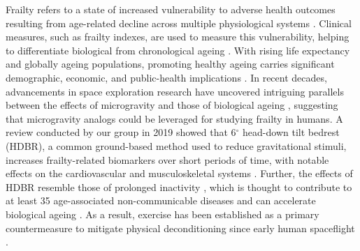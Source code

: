 \documentclass[preprint,12pt,authoryear]{elsarticle}
\begin{document}
   Frailty refers to a state of increased vulnerability to adverse health outcomes resulting from age-related decline across multiple physiological systems \citep{lengFrailtySyndromeOverview2014}. Clinical measures, such as frailty indexes, are used to measure this vulnerability, helping to differentiate biological from chronological ageing \citep{lengFrailtySyndromeOverview2014, rockwoodAgerelatedDeficitAccumulation2019}. With rising life expectancy and globally ageing populations, promoting healthy ageing carries significant demographic, economic, and public-health implications \citep{sowaPredictorsHealthyAgeing2016, roweSuccessfulAging1997}. In recent decades, advancements in space exploration research have uncovered intriguing parallels between the effects of microgravity and those of biological ageing \citep{vernikosSpaceGravityPhysiology2009, pavy-letraonSpaceEarthAdvances2007}, suggesting that microgravity analogs could be leveraged for studying frailty in humans. A review conducted by our group in 2019 showed that 6$^\circ$ head-down tilt bedrest (HDBR), a common ground-based method used to reduce gravitational stimuli, increases frailty-related biomarkers over short periods of time, with notable effects on the cardiovascular and musculoskeletal systems \citep{kehlerBedRestAccelerated2019}. Further, the effects of HDBR resemble those of prolonged inactivity \citep{vernikosSpaceGravityPhysiology2009, pavy-letraonSpaceEarthAdvances2007}, which is thought to contribute to at least 35 age-associated non-communicable diseases and can accelerate biological ageing \citep{boothRoleInactivityChronic2017}. As a result, exercise has been established as a primary countermeasure to mitigate physical deconditioning since early human spaceflight \citep{hedgeImplementationExerciseCountermeasures2022}.
\end{document}
